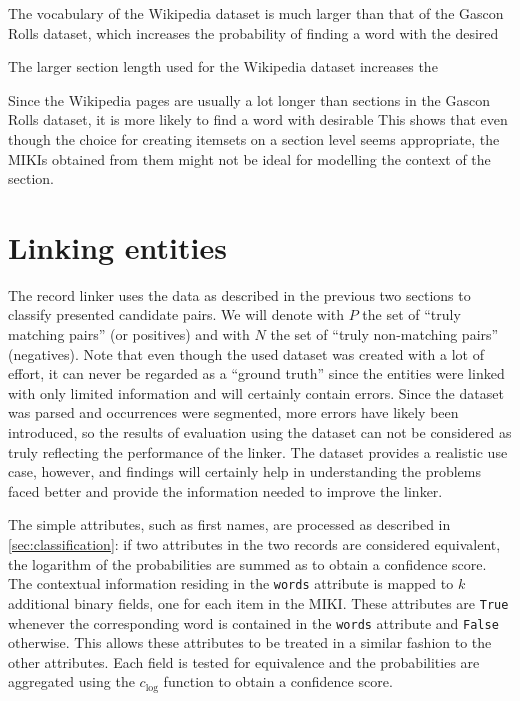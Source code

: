 

The vocabulary of the Wikipedia dataset is much larger than that of the Gascon Rolls dataset, which increases the probability of finding a word with the desired

The larger section length used for the Wikipedia dataset increases the 


Since the Wikipedia pages are usually a lot longer than sections in the Gascon Rolls dataset, it is more likely to find a word with desirable 
This shows that even though the choice for creating itemsets on a section level seems appropriate, the MIKIs obtained from them might not be ideal for modelling the context of the section.




\section{Linking entities}
\label{sec:linking_entities}

The record linker uses the data as described in the previous two sections to classify presented candidate pairs.
We will denote with $P$ the set of ``truly matching pairs'' (or positives) and with $N$ the set of ``truly non-matching pairs'' (negatives).
Note that even though the used dataset was created with a lot of effort, it can never be regarded as a ``ground truth'' since the entities were linked with only limited information and will certainly contain errors.
Since the dataset was parsed and occurrences were segmented, more errors have likely been introduced, so the results of evaluation using the dataset can not be considered as truly reflecting the performance of the linker.
The dataset provides a realistic use case, however, and findings will certainly help in understanding the problems faced better and provide the information needed to improve the linker.

The simple attributes, such as first names, are processed as described in \cref{sec:classification}: if two attributes in the two records are considered equivalent, the logarithm of the probabilities are summed as to obtain a confidence score.
The contextual information residing in the \texttt{words} attribute is mapped to $k$ additional binary fields, one for each item in the MIKI.
These attributes are \texttt{True} whenever the corresponding word is contained in the \texttt{words} attribute and \texttt{False} otherwise.
This allows these attributes to be treated in a similar fashion to the other attributes.
Each field is tested for equivalence and the probabilities are aggregated using the $c_{\mathrm{log}}$ function to obtain a confidence score.

